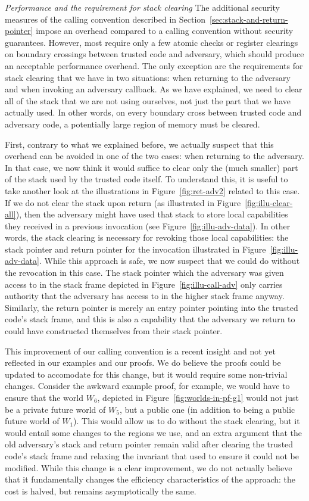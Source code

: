 \documentclass[format=acmsmall, review=true, screen=true]{acmart}
\renewcommand{\sectionname}{Section}
\begin{document}
\emph{Performance and the requirement for stack clearing} The additional
security measures of the calling convention described in
\sectionname~\ref{sec:stack-and-return-pointer} impose an overhead compared to a
calling convention without security guarantees. However, most require only a few
atomic checks or register clearings on boundary crossings between trusted code
and adversary, which should produce an acceptable performance overhead. The only
exception are the requirements for stack clearing that we have in two
situations: when returning to the adversary and when invoking an adversary
callback. As we have explained, we need to clear all of the stack that we are
not using ourselves, not just the part that we have actually used. In other
words, on every boundary cross between trusted code and adversary code, a
potentially large region of memory must be cleared.

First, contrary to what we explained before, we actually suspect that this overhead can be avoided in one of the two cases: when returning to the adversary.
In that case, we now think it would suffice to clear only the (much smaller) part of the stack used by the trusted code itself.
To understand this, it is useful to take another look at the illustrations in Figure~\ref{fig:ret-adv2} related to this case.
If we do not clear the stack upon return (as illustrated in Figure~\ref{fig:illu-clear-all}), then the adversary might have used that stack to store local capabilities they received in a previous invocation (see Figure~\ref{fig:illu-adv-data}).
In other words, the stack clearing is necessary for revoking those local capabilities: the stack pointer and return pointer for the invocation illustrated in Figure~\ref{fig:illu-adv-data}.
While this approach is safe, we now suspect that we could do without the revocation in this case.
The stack pointer which the adversary was given access to in the stack frame depicted in Figure~\ref{fig:illu-call-adv} only carries authority that the adversary has access to in the higher stack frame anyway.
Similarly, the return pointer is merely an entry pointer pointing into the trusted code's stack frame, and this is also a capability that the adversary we return to could have constructed themselves from their stack pointer.

This improvement of our calling convention is a recent insight and not yet reflected in our examples and our proofs.
We do believe the proofs could be updated to accomodate for this change, but it would require some non-trivial changes.
Consider the awkward example proof, for example, we would have to ensure that the world $W_6$, depicted in Figure~\ref{fig:worlds-in-pf-g1} would not just be a private future world of $W_5$, but a public one (in addition to being a public future world of $W_1$).
This would allow us to do without the stack clearing, but it would entail some changes to the regions we use, and an extra argument that the old adversary's stack and return pointer remain valid after clearing the trusted code's stack frame and relaxing the invariant that used to ensure it could not be modified.
While this change is a clear improvement, we do not actually believe that it fundamentally changes the efficiency characteristics of the approach: the cost is halved, but remains asymptotically the same.
\end{document}
